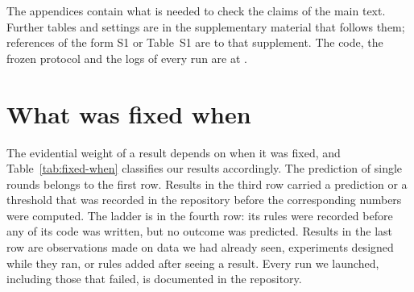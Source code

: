 
\noindent The appendices contain what is needed to check the claims of the
main text. Further tables and settings are in the
supplementary material that follows them; references of the form S1 or
Table~S1 are to that supplement. The code, the frozen protocol and the logs
of every run are at \repourl.

\section{What was fixed when}
\label{app:fixed-when}

The evidential weight of a result depends on
when it was fixed, and Table~\ref{tab:fixed-when} classifies our results
accordingly. The prediction of single rounds belongs to the first row.
Results in the third row carried a prediction or a threshold that was
recorded in the repository before the corresponding numbers were computed.
The ladder is in the fourth row: its rules were recorded before any of its
code was written, but no outcome was predicted. Results in the last row are
observations made on data we had already seen, experiments designed while
they ran, or rules added after seeing a result. Every run we launched, including those that failed,
is documented in the repository.

